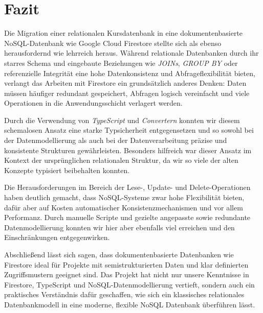 \documentclass[12pt,a4paper%
              ,oneside     %
              ,titlepage
              ,DIV=13
              ,headinclude
              ,footinclude=false%
              ,cleardoublepage=empty%
              ,parskip=half,
              BCOR=0mm,
              ]{scrreprt}
\begin{document}
\chapter{Fazit}

Die Migration einer relationalen Kursdatenbank in eine dokumentenbasierte NoSQL-Datenbank wie Google Cloud Firestore stellte sich als ebenso herausfordernd wie lehrreich heraus. Während relationale Datenbanken durch ihr starres Schema und eingebaute Beziehungen wie \textit{JOINs}, \textit{GROUP BY} oder referenzielle Integrität eine hohe Datenkonsistenz und Abfrageflexibilität bieten, verlangt das Arbeiten mit Firestore ein grundsätzlich anderes Denken: Daten müssen häufiger redundant gespeichert, Abfragen logisch vereinfacht und viele Operationen in die Anwendungsschicht verlagert werden.

Durch die Verwendung von \textit{TypeScript} und \textit{Convertern} konnten wir diesem schemalosen Ansatz eine starke Typsicherheit entgegensetzen und so sowohl bei der Datenmodellierung als auch bei der Datenverarbeitung präzise und konsistente Strukturen gewährleisten. Besonders hilfreich war dieser Ansatz im Kontext der ursprünglichen relationalen Struktur, da wir so viele der alten Konzepte typisiert beibehalten konnten.

Die Herausforderungen im Bereich der Lese-, Update- und Delete-Operationen haben deutlich gemacht, dass NoSQL-Systeme zwar hohe Flexibilität bieten, dafür aber auf Kosten automatischer Konsistenzmechanismen und vor allem Performanz. Durch manuelle Scripte und gezielte angepasste sowie redundante Datenmodellierung konnten wir hier aber ebenfalls viel erreichen und den Einschränkungen entgegenwirken.

Abschließend lässt sich sagen, dass dokumentenbasierte Datenbanken wie Firestore ideal für Projekte mit semistrukturierten Daten und klar definierten Zugriffsmustern geeignet sind. Das Projekt hat nicht nur unsere Kenntnisse in Firestore, TypeScript und NoSQL-Datenmodellierung vertieft, sondern auch ein praktisches Verständnis dafür geschaffen, wie sich ein klassisches relationales Datenbankmodell in eine moderne, flexible NoSQL Datenbank überführen lässt.


\appendix




\renewcommand{\bibfont}{\footnotesize}
\printbibliography[title={Literaturverzeichnis}, 
                   heading=bibintoc]


{ %
\printindex
}
\end{document}
